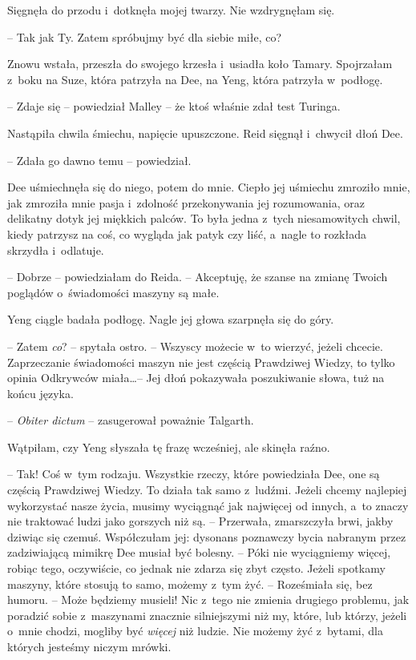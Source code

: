 \documentclass[oneside,polish,11pt,sfheadings]{mwbk}
\let\footnote=\endnote
\begin{document}
Sięgnęła do przodu i~dotknęła mojej twarzy. Nie wzdrygnęłam się. 

-- Tak jak Ty. Zatem spróbujmy być dla siebie miłe, co?

Znowu wstała, przeszła do swojego krzesła i~usiadła koło Tamary.
Spojrzałam z~boku na Suze, która patrzyła na Dee, na Yeng, która
patrzyła w~podłogę.

-- Zdaje się -- powiedział Malley -- że ktoś właśnie zdał test Turinga.

Nastąpiła chwila śmiechu, napięcie upuszczone. Reid sięgnął i~chwycił
dłoń Dee. 

-- Zdała go dawno temu -- powiedział.

Dee uśmiechnęła się do niego, potem do mnie. Ciepło jej uśmiechu
zmroziło mnie, jak zmroziła mnie pasja i~zdolność przekonywania jej
rozumowania, oraz delikatny dotyk jej miękkich palców. To była jedna z~tych niesamowitych chwil, kiedy patrzysz na coś, co wygląda jak patyk
czy liść, a~nagle to rozkłada skrzydła i~odlatuje.

-- Dobrze -- powiedziałam do Reida. -- Akceptuję, że szanse na zmianę
Twoich poglądów o~świadomości maszyny są małe.

Yeng ciągle badała podłogę. Nagle jej głowa szarpnęła się do góry. 

-- Zatem \textit{co}? -- spytała ostro. -- Wszyscy możecie w~to wierzyć, jeżeli
chcecie. Zaprzeczanie świadomości maszyn nie jest częścią Prawdziwej
Wiedzy, to tylko opinia Odkrywców miała\ldots  -- Jej dłoń pokazywała
poszukiwanie słowa, tuż na końcu języka.

-- \textit{Obiter dictum}\footnote{ łac. powiedziane mimochodem -- przyp.tłum.} -- zasugerował poważnie Talgarth.

Wątpiłam, czy Yeng słyszała tę frazę wcześniej, ale skinęła raźno. 

-- Tak! Coś w~tym rodzaju. Wszystkie rzeczy, które powiedziała Dee, one są
częścią Prawdziwej Wiedzy. To działa tak samo z~ludźmi. Jeżeli chcemy
najlepiej wykorzystać nasze życia, musimy wyciągnąć jak najwięcej od
innych, a~to znaczy nie traktować ludzi jako gorszych niż są. -- Przerwała, zmarszczyła brwi, jakby dziwiąc się czemuś. Współczułam jej:
dysonans poznawczy bycia nabranym przez zadziwiającą mimikrę Dee musiał
być bolesny. -- Póki nie wyciągniemy więcej, robiąc tego, oczywiście, co
jednak nie zdarza się zbyt często. Jeżeli spotkamy maszyny, które
stosują to samo, możemy z~tym żyć. -- Roześmiała się, bez humoru. -- Może
będziemy musieli! Nic z~tego nie zmienia drugiego problemu, jak poradzić
sobie z~maszynami znacznie silniejszymi niż my, które, lub którzy,
jeżeli o~mnie chodzi, mogliby być \textit{więcej} niż ludzie. Nie możemy
żyć z~bytami, dla których jesteśmy niczym mrówki.
\end{document}

